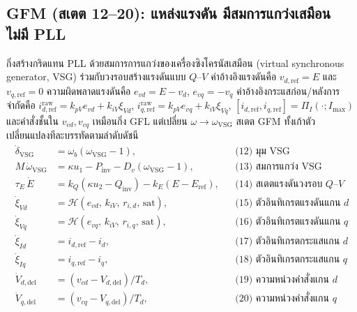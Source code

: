\documentclass[12pt,a4paper]{article}
\begin{document}
\subsection{ GFM (สเตต 12--20): แหล่งแรงดัน มีสมการแกว่งเสมือน ไม่มี PLL}
กิ่งสร้างกริดแทน PLL ด้วยสมการการแกว่งของเครื่องซิงโครนัสเสมือน (virtual
synchronous generator, VSG) ร่วมกับวงรอบสร้างแรงดันแบบ $Q$--$V$ ค่าอ้างอิงแรงดันคือ
$v_{d,\mathrm{ref}}=E$ และ $v_{q,\mathrm{ref}}=0$ ความผิดพลาดแรงดันคือ
$e_{vd}=E-v_d$, $e_{vq}=-v_q$ ค่าอ้างอิงกระแสก่อน/หลังการจำกัดคือ
$i_{d,\mathrm{ref}}^{\mathrm{raw}}=k_{pV}e_{vd}+k_{iV}\xi_{Vd}$,
$i_{q,\mathrm{ref}}^{\mathrm{raw}}=k_{pV}e_{vq}+k_{iV}\xi_{Vq}$,
$[i_{d,\mathrm{ref}},i_{q,\mathrm{ref}}]=\Pi_I(\cdot;I_{\max})$ และคำสั่งชั้นใน
$v_{cd},v_{cq}$ เหมือนกิ่ง GFL แต่เปลี่ยน $\omega\to\omega_{\mathrm{VSG}}$
สเตต GFM ทั้งเก้าตัวเปลี่ยนแปลงทีละบรรทัดตามลำดับดัชนี
\begin{align}
  \dot{\delta}_{\mathrm{VSG}} &= \omega_b(\omega_{\mathrm{VSG}}-1), &&\text{(12) มุม VSG}\\
  M\,\dot{\omega}_{\mathrm{VSG}} &= \kappa u_1-P_{\mathrm{inv}}-D_v(\omega_{\mathrm{VSG}}-1),
     &&\text{(13) สมการแกว่ง VSG}\\
  \tau_E\,\dot{E} &= k_Q(\kappa u_2-Q_{\mathrm{inv}})-k_E(E-E_{\mathrm{ref}}),
     &&\text{(14) สเตตแรงดันวงรอบ $Q$--$V$}\\
  \dot{\xi}_{Vd} &= \mathcal{H}(e_{vd},\,k_{iV},\,r_{i,d},\,\text{sat}),
     &&\text{(15) ตัวอินทิเกรตแรงดันแกน $d$}\\
  \dot{\xi}_{Vq} &= \mathcal{H}(e_{vq},\,k_{iV},\,r_{i,q},\,\text{sat}),
     &&\text{(16) ตัวอินทิเกรตแรงดันแกน $q$}\\
  \dot{\xi}_{Id} &= i_{d,\mathrm{ref}}-i_d, &&\text{(17) ตัวอินทิเกรตกระแสแกน $d$}\\
  \dot{\xi}_{Iq} &= i_{q,\mathrm{ref}}-i_q, &&\text{(18) ตัวอินทิเกรตกระแสแกน $q$}\\
  \dot{V}_{d,\mathrm{del}} &= (v_{cd}-V_{d,\mathrm{del}})/T_d, &&\text{(19) ความหน่วงคำสั่งแกน $d$}\\
  \dot{V}_{q,\mathrm{del}} &= (v_{cq}-V_{q,\mathrm{del}})/T_d, &&\text{(20) ความหน่วงคำสั่งแกน $q$}
\end{align}
\end{document}
